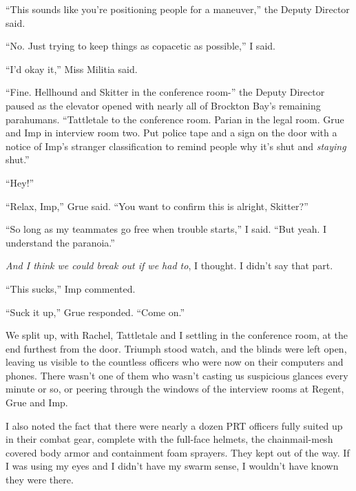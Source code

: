 ``This sounds like you're positioning people for a maneuver,'' the Deputy Director said.



``No.  Just trying to keep things as copacetic as possible,'' I said.



``I'd okay it,'' Miss Militia said.



``Fine.  Hellhound and Skitter in the conference room-'' the Deputy Director paused as the elevator opened with nearly all of Brockton Bay's remaining parahumans.  ``Tattletale to the conference room.  Parian in the legal room.  Grue and Imp in interview room two.  Put police tape and a sign on the door with a notice of Imp's stranger classification to remind people why it's shut and \emph{staying} shut.''



``Hey!''



``Relax, Imp,'' Grue said.  ``You want to confirm this is alright, Skitter?''



``So long as my teammates go free when trouble starts,'' I said.  ``But yeah.  I understand the paranoia.''



\emph{And I think we could break out if we had to}, I thought.  I didn't say that part.



``This sucks,'' Imp commented.



``Suck it up,'' Grue responded.  ``Come on.''



We split up, with Rachel, Tattletale and I settling in the conference room, at the end furthest from the door.  Triumph stood watch, and the blinds were left open, leaving us visible to the countless officers who were now on their computers and phones.  There wasn't one of them who wasn't casting us suspicious glances every minute or so, or peering through the windows of the interview rooms at Regent, Grue and Imp.



I also noted the fact that there were nearly a dozen PRT officers fully suited up in their combat gear, complete with the full-face helmets, the chainmail-mesh covered body armor and containment foam sprayers.  They kept out of the way.  If I was using my eyes and I didn't have my swarm sense, I wouldn't have known they were there.



